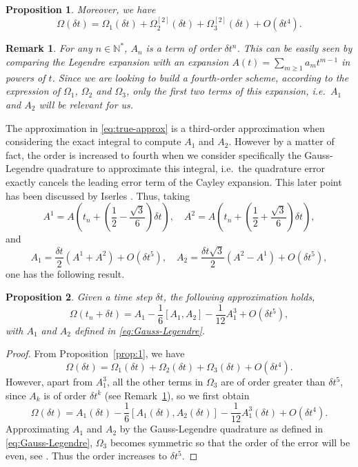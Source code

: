 \documentclass{article}
\newtheorem{proposition}{Proposition}[section]
\newtheorem{remark}{Remark}
\newcommand{\Om}{\Omega}
\begin{document}
{\begin{proposition}
%
Moreover, we have
%
\begin{equation}
\label{eq:true-approx}
\Om(\delta t) = \Om_1(\delta t) + \Om_2^{[2]}(\delta t) + \Om_3^{[2]}(\delta t) + O(\delta t^4).
\end{equation}
\end{proposition}

\begin{remark}
\label{rmk:2}
For any $n \in \mathbb{N}^*$, $A_n$ is a term of order $\delta t^n$. This can be easily seen by comparing the Legendre expansion with an expansion $A(t) = \sum_{m\geq 1} a_m t^{m-1}$ in powers of $t$. Since we are looking to build a fourth-order scheme, according to the expression of $\Om_1$, $\Om_2$ and $\Om_3$, only the first two terms of this expansion, i.e.~$A_1$ and $A_2$ will be relevant for us.
\end{remark}

The approximation in \eqref{eq:true-approx} is a third-order approximation when considering the exact integral to compute $A_1$ and $A_2$. However by a matter of fact, the order is increased to fourth when we consider specifically the Gauss-Legendre quadrature to approximate this integral, i.e.\ the quadrature error exactly cancels the leading error term of the Cayley expansion. This later point has been discussed by Iserles \cite{Iserles:2001}. Thus, taking
%
\[
A^1 = A\left(t_n + \left(\frac{1}{2}-\frac{\sqrt{3}}{6} \right) \delta t\right), \quad A^2 = A\left(t_n + \left(\frac{1}{2}+\frac{\sqrt{3}}{6} \right) \delta t \right),
\]
%
and
%
\begin{equation}
\label{eq:Gauss-Legendre}
A_1 = \frac{\delta t}{2}(A^1 + A^2) + O(\delta t^5), \quad  A_2 = \frac{\delta t\sqrt{3}}{2}(A^2 - A^1) + O(\delta t^5),
\end{equation}
%
one has the following result.

\begin{proposition}
\label{prop:2}
Given a time step $\delta t$, the following approximation holds,
%
\begin{equation}
\label{eq:simplify-approx}
\Om(t_n + \delta t) = A_1 -\frac{1}{6} [A_1, A_2] - \frac{1}{12} A_1^3  + O(\delta t^5),
\end{equation}
%
with $A_1$ and $A_2$ defined in \eqref{eq:Gauss-Legendre}.
\end{proposition}

\begin{proof}
From Proposition~\ref{prop:1}, we have 
%
\[
\Om(\delta t) = \Om_1(\delta t) + \Om_2(\delta t) + \Om_3(\delta t) + O(\delta t^4).
\]
However, apart from $A_1^3$, all the other terms in $\Om_3$ are of order greater than $\delta t^5$, since $A_k$ is of order $\delta t^k$ (see Remark~\ref{rmk:2}), so we first obtain
%
\[
\Om(\delta t) = A_1(\delta t) -\frac{1}{6} [A_1(\delta t), A_2(\delta t)] - \frac{1}{12} A_1^3(\delta t)  + O(\delta t^4).
\]
%
Approximating $A_1$ and $A_2$ by the Gauss-Legendre quadrature as defined in \eqref{eq:Gauss-Legendre}, $\Om_3$ becomes symmetric so that the order of the error will be even, see \cite[Sec.~4.2]{Iserles:2001}. Thus the order increases to $\delta t^5$. 
\end{proof}

}
\end{document}
